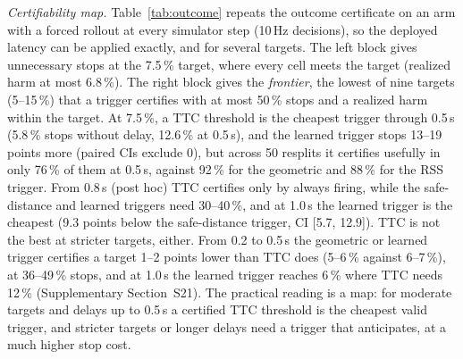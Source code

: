 \documentclass[lettersize,journal]{IEEEtran}
\begin{document}
\emph{Certifiability map.} Table~\ref{tab:outcome} repeats the outcome certificate
on an arm with a forced rollout at every simulator step (10\,Hz decisions),
so the deployed latency can be applied exactly, and for several targets. The
left block gives unnecessary stops at the 7.5\,\% target, where every cell meets
the target (realized harm at most 6.8\,\%). The right block gives the
\emph{frontier}, the lowest of nine targets (5--15\,\%) that a trigger certifies
with at most 50\,\% stops and a realized harm within the target. At 7.5\,\%, a TTC
threshold is the cheapest trigger through 0.5\,s (5.8\,\% stops without delay,
12.6\,\% at 0.5\,s), and the learned trigger stops 13--19 points more (paired CIs
exclude 0), but across 50 resplits it certifies usefully in only 76\,\% of them at
0.5\,s, against 92\,\% for the geometric and 88\,\% for the RSS trigger. From
0.8\,s (post hoc) TTC certifies only by always firing, while the
safe-distance and learned triggers need 30--40\,\%, and at 1.0\,s the learned
trigger is the cheapest (9.3 points below the safe-distance trigger, CI
[5.7, 12.9]). TTC is not the best at stricter targets, either. From
0.2 to 0.5\,s the geometric or learned trigger certifies a target 1--2 points
lower than TTC does (5--6\,\% against 6--7\,\%), at 36--49\,\% stops, and at
1.0\,s the learned trigger reaches 6\,\% where TTC needs 12\,\% (Supplementary
Section~S21). The practical reading is a map: for moderate targets and delays
up to 0.5\,s a certified TTC threshold is the cheapest valid trigger, and
stricter targets or longer delays need a trigger that anticipates, at a much
higher stop cost.
\end{document}
